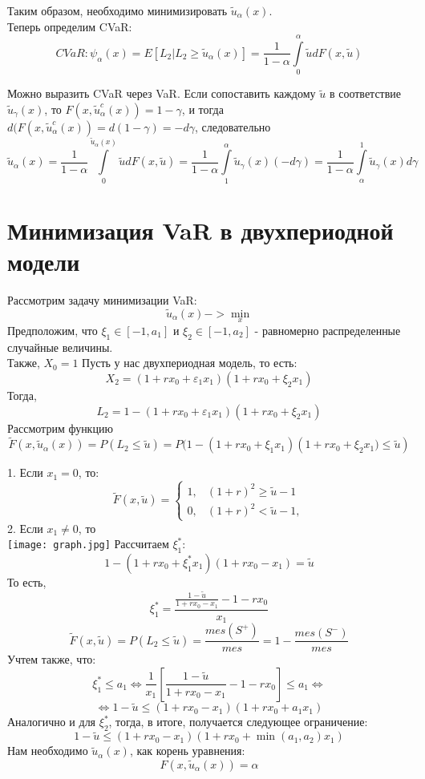 \documentclass[18pt,a4paper]{article}
\theoremstyle{plain}
\theoremstyle{definition}
\begin{document}
Таким образом, необходимо минимизировать $\tilde{u}_\alpha (x)$.\\
Теперь определим CVaR:\\
$$
CVaR: \psi_\alpha (x) = E[L_2 | L_2 \ge \tilde{u}_\alpha (x)] = \frac{1}{1-\alpha} \int\limits_{0}^{\alpha} \tilde{u} dF(x,\tilde{u})
$$

Можно выразить CVaR через VaR. Если сопоставить каждому $\tilde{u}$ в соответствие $\tilde{u}_\gamma (x)$, то $F(x,\tilde{u}_\alpha^c (x)) = 1-\gamma$, и тогда $d(F(x,\tilde{u}_\alpha^c (x)) = d(1-\gamma) =  -d\gamma$, следовательно \\
$$
\tilde{u}_\alpha (x) = \frac{1}{1-\alpha} \int\limits_{0}^{\tilde{u}_\alpha (x)} \tilde{u} dF(x,\tilde{u}) = \frac{1}{1-\alpha} \int\limits_{1}^{\alpha} \tilde{u}_\gamma (x) (-d\gamma) = \frac{1}{1-\alpha} \int \limits_{\alpha}^{1} \tilde{u}_\gamma (x) d\gamma
$$

\centering\section{Минимизация VaR в двухпериодной модели}
\flushleft
Рассмотрим задачу минимизации VaR:
$$
\tilde{u}_\alpha (x) -> \min\limits_x
$$
Предположим, что $\xi_1 \in [-1, a_1]$ и $\xi_2 \in [-1, a_2]$ - равномерно распределенные случайные величины.\\
Также, $X_0 = 1$
Пусть у нас двухпериодная модель, то есть:
$$
X_2 = (1+rx_0+\varepsilon_1 x_1)(1+rx_0+\xi_2 x_1)
$$
Тогда,
$$
L_2 = 1-(1+rx_0+\varepsilon_1 x_1)(1+rx_0+\xi_2 x_1)
$$
Рассмотрим функцию
$$
\tilde{F}(x,\tilde{u}_\alpha (x) ) = P(L_2 \le \tilde{u}) = P\big(1-(1+rx_0+\xi_1 x_1)(1+rx_0+\xi_2 x_1\big) \le \tilde{u})
$$

1. Если $x_1 = 0$, то:\\
$$
\tilde{F}(x,\tilde{u}) =
\left\{\begin{matrix}
1, &(1+r)^2 \ge \tilde{u}-1 \\
0, &(1+r)^2 < \tilde{u}-1,
\end{matrix}\right.
$$
2. Если $x_1 \neq0$, то\\

\texttt{[image: graph.jpg]}
Рассчитаем $\xi_1^*$:
$$
1- (1+rx_0+\xi_1^* x_1)(1+rx_0- x_1) = \tilde{u}
$$
То есть,
$$
\xi_1^* = \frac{\frac{1-\tilde{u}}{1+rx_0-x_1}-1-rx_0}{x_1}
$$
$$
\tilde{F}(x,\tilde{u}) = P(L_2\le \tilde{u})=\frac{mes(S^+)}{mes} = 1-\frac{mes(S^-)}{mes}
$$
Учтем также, что:\\
$$
\xi_1^* \le a_1 \Leftrightarrow \frac{1}{x_1}[\frac{1-\tilde{u}}{1+rx_0-x_1} -1-rx_0]\le a_1\Leftrightarrow
$$
$$
\Leftrightarrow 1-\tilde{u} \le(1+rx_0-x_1)(1+rx_0+a_1 x_1)
$$
Аналогично и для $\xi_2^*$, тогда, в итоге, получается следующее ограничение:\\
$$
1-\tilde{u} \le(1+rx_0-x_1)(1+rx_0+\min(a_1,a_2) x_1)
$$
\vspace{15pt}
Нам необходимо $\tilde{u}_\alpha (x)$, как корень уравнения:\\
$$
F(x,\tilde{u}_\alpha (x)) = \alpha
$$
\end{document}
